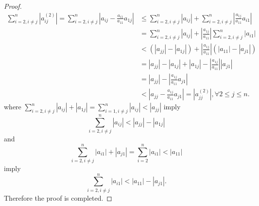 \documentclass[11pt,a4paper]{article}
\renewcommand{\(}{\left(}
\renewcommand{\)}{\right)}
\begin{document}
\begin{proof}
  	\begin{align*}
  	\sum\limits_{i=2,i\neq j}^{n}\left\vert a_{ij}^{(2)}\right\vert
  	=\sum\limits_{i=2,i\neq j}^{n}\left\vert a_{ij}-\frac{a_{i1}}{a_{11}}%
  	a_{1j}\right\vert 
  	&\leq\sum\limits_{i=2,i\neq j}%
  	^{n}\left\vert a_{ij}\right\vert +\sum\limits_{i=2,i\neq j}^{n}\left\vert
  	\frac{a_{1j}}{a_{11}}a_{i1}\right\vert \\
  	&=\sum\limits_{i=2,i\neq j}^{n}\left\vert
  	a_{ij}\right\vert +\left\vert \frac{a_{1j}}{a_{11}}\right\vert \sum
  	\limits_{i=2,i\neq j}^{n}\left\vert a_{i1}\right\vert \\
  	&<(\left\vert a_{jj}\right\vert -\left\vert
  	a_{1j}\right\vert )+\left\vert \frac{a_{1j}}{a_{11}}\right\vert (\left\vert
  	a_{11}\right\vert -\left\vert a_{j1}\right\vert )\\
  	&=\left\vert a_{jj}\right\vert -\left\vert
  	a_{1j}\right\vert +\left\vert a_{1j}\right\vert -\left\vert \frac{a_{1j}%
  	}{a_{11}}\right\vert \left\vert a_{j1}\right\vert\\
  	&=\left\vert a_{jj}\right\vert -\left\vert
  	\frac{a_{1j}}{a_{11}}a_{j1}\right\vert \\
  	&<\left\vert a_{jj}-\frac{a_{1j}}{a_{11}}%
  	a_{j1}\right\vert =\left\vert a_{jj}^{(2)}\right\vert ,\forall2\leq j\leq n.
  	\end{align*}
  	where $\sum\limits_{i=2,i\neq j}^{n}\left\vert a_{ij}\right\vert +\left\vert
  	a_{1j}\right\vert =\sum\limits_{i=1,i\neq j}^{n}\left\vert a_{ij}\right\vert
  	<\left\vert a_{jj}\right\vert $ imply $$\sum\limits_{i=2,i\neq j}^{n}\left\vert
  	a_{ij}\right\vert <\left\vert a_{jj}\right\vert -\left\vert a_{1j}\right\vert
  	$$ and $$\sum\limits_{i=2,i\neq j}^{n}\left\vert a_{i1}\right\vert +\left\vert
  	a_{j1}\right\vert =\sum\limits_{i=2}^{n}\left\vert a_{i1}\right\vert
  	<\left\vert a_{11}\right\vert $$ imply $$\sum\limits_{i=2,i\neq j}^{n}\left\vert
  	a_{i1}\right\vert <\left\vert a_{11}\right\vert -\left\vert a_{j1}\right\vert.
  	$$
  	Therefore the proof is completed.
  \end{proof}  
\end{document}
